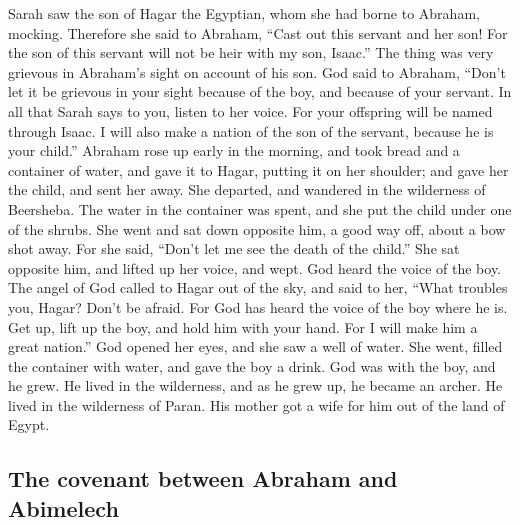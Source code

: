  Sarah saw the son of Hagar the Egyptian, whom she had
borne to Abraham, mocking.  Therefore she said to
Abraham, ``Cast out this servant and her son! For the son of this
servant will not be heir with my son, Isaac.''  The thing
was very grievous in Abraham's sight on account of his son.
 God said to Abraham, ``Don't let it be grievous in your
sight because of the boy, and because of your servant. In all that Sarah
says to you, listen to her voice. For your offspring will be named
through Isaac.  I will also make a nation of the son of
the servant, because he is your child.''  Abraham rose up
early in the morning, and took bread and a container of water, and gave
it to Hagar, putting it on her shoulder; and gave her the child, and
sent her away. She departed, and wandered in the wilderness of
Beersheba.  The water in the container was spent, and she
put the child under one of the shrubs.  She went and sat
down opposite him, a good way off, about a bow shot away. For she said,
``Don't let me see the death of the child.'' She sat opposite him, and
lifted up her voice, and wept.  God heard the voice of
the boy. The angel of God called to Hagar out of the sky, and said to
her, ``What troubles you, Hagar? Don't be afraid. For God has heard the
voice of the boy where he is.  Get up, lift up the boy,
and hold him with your hand. For I will make him a great nation.''
 God opened her eyes, and she saw a well of water. She
went, filled the container with water, and gave the boy a drink.
 God was with the boy, and he grew. He lived in the
wilderness, and as he grew up, he became an archer.  He
lived in the wilderness of Paran. His mother got a wife for him out of
the land of Egypt.

\hypertarget{the-covenant-between-abraham-and-abimelech}{%
\subsection{The covenant between Abraham and
Abimelech}\label{the-covenant-between-abraham-and-abimelech}}

